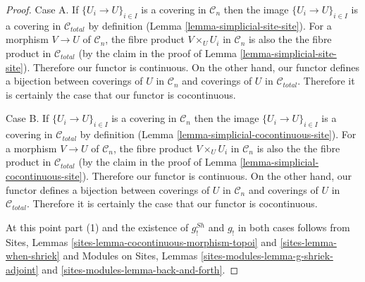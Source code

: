 \begin{proof}
Case A. If $\{U_i \to U\}_{i \in I}$ is a covering in $\mathcal{C}_n$
then the image $\{U_i \to U\}_{i \in I}$ is a covering in $\mathcal{C}_{total}$
by definition (Lemma \ref{lemma-simplicial-site-site}). For a morphism
$V \to U$ of $\mathcal{C}_n$, the fibre product
$V \times_U U_i$ in $\mathcal{C}_n$ is also the
the fibre product in $\mathcal{C}_{total}$ (by the claim in the
proof of Lemma \ref{lemma-simplicial-site-site}).
Therefore our functor is continuous. On the other hand, our functor
defines a bijection between coverings of $U$ in $\mathcal{C}_n$
and coverings of $U$ in $\mathcal{C}_{total}$. Therefore it is
certainly the case that our functor is cocontinuous.

\medskip\noindent
Case B. If $\{U_i \to U\}_{i \in I}$ is a covering in $\mathcal{C}_n$
then the image $\{U_i \to U\}_{i \in I}$ is a covering in $\mathcal{C}_{total}$
by definition (Lemma \ref{lemma-simplicial-cocontinuous-site}). For a morphism
$V \to U$ of $\mathcal{C}_n$, the fibre product
$V \times_U U_i$ in $\mathcal{C}_n$ is also the
the fibre product in $\mathcal{C}_{total}$ (by the claim in the
proof of Lemma \ref{lemma-simplicial-cocontinuous-site}).
Therefore our functor is continuous. On the other hand, our functor
defines a bijection between coverings of $U$ in $\mathcal{C}_n$
and coverings of $U$ in $\mathcal{C}_{total}$. Therefore it is
certainly the case that our functor is cocontinuous.

\medskip\noindent
At this point part (1) and the existence of $g^{Sh}_!$ and $g_!$
in both cases follows from
Sites, Lemmas \ref{sites-lemma-cocontinuous-morphism-topoi} and
\ref{sites-lemma-when-shriek}
and
Modules on Sites, Lemmas \ref{sites-modules-lemma-g-shriek-adjoint} and
\ref{sites-modules-lemma-back-and-forth}.


\end{proof}
